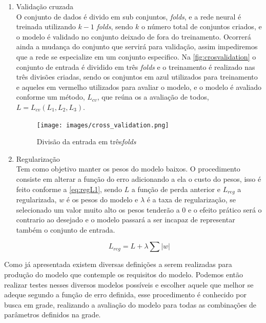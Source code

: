 \documentclass[
    12pt,
    oneside,
    a4paper,
    english,
    brazil
]{abntex2}
\begin{document}
\begin{enumerate}
    \item Validação cruzada\\
        O conjunto de dados é divido em sub conjuntos, \textit{folds}, e a rede
        neural é treinada  utilizando $k-1$ \textit{folds}, sendo  $k$ o número
        total de conjuntos  criados, e o modelo é validado  no conjunto deixado
        de  fora do  treinamento.  Ocorrerá  ainda a  mudança  do conjunto  que
        servirá para validação, assim impediremos  que a rede se especialize em
        um conjunto  especifico. Na \autoref{fig:crosvalidation} o  conjunto de
        entrada é dividido  em três \textit{folds} e o  treinamento é realizado
        nas três divisões  criadas, sendo os conjuntos em  azul utilizados para
        treinamento e aqueles em vermelho utilizados para avaliar o modelo, e o
        modelo  é  avaliado  conforme  um  método, $L_{cv}$,  que  reúna  os  a
        avaliação de todos, $L = L_{cv}(L_1, L_2, L_3)$.

        \begin{figure}[ht]
            \centering
            \caption{Divisão da entrada em três\textit{folds}}\label{fig:crosvalidation}
            \texttt{[image: images/cross\_validation.png]}
        \end{figure}

    \item Regularização\\
        Tem  como objetivo  manter os  pesos do  modelo baixos.  O procedimento
        consiste  em alterar  a função  do erro  adicionando a  ela o  custo do
        pesos, isso é  feito conforme a \autoref{eq:regL1}, sendo  $L$ a função
        de perda anterior e $L_{reg}$ a  regularizada, $w$ é os pesos do modelo
        e $\lambda$  é a taxa de  regularização, se selecionado um  valor muito
        alto os  pesos tenderão a  $0$ e o efeito  prático será o  contrario ao
        desejado  e o  modelo passará  a ser  incapaz de  representar também  o
        conjunto de entrada.

        \begin{equation}\label{eq:regL1}
            L_{reg} = L + \lambda \sum{|w|}
        \end{equation}
\end{enumerate}

Como  já  apresentada  existem  diversas definições  a  serem  realizadas  para
produção  do  modelo que  contemple  os  requisitos  do modelo.  Podemos  então
realizar testes nesses diversos modelos  possíveis e escolher aquele que melhor
se adeque segundo a função de  erro definida, esse procedimento é conhecido por
busca em grade,  realizando a avaliação do modelo para  todas as combinações de
parâmetros definidos na grade.
\end{document}
